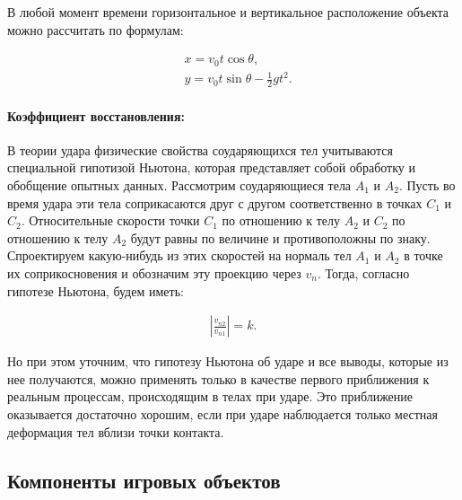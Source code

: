 В любой момент времени горизонтальное и вертикальное расположение объекта можно рассчитать по формулам:

\begin{align}
	& x = v_0 t \cos \theta, \label{math.position_x} \\
	& y = v_0 t \sin \theta - \frac12 g t^2. \label{math.position_y}
\end{align}

\paragraph{Коэффициент восстановления:}

В теории удара физические свойства соударяющихся тел учитываются специальной гипотизой Ньютона, которая представляет собой обработку и обобщение опытных данных. Рассмотрим соударяющиеся тела $A_1$ и $A_2$. Пусть во время удара эти тела соприкасаются друг с другом соответственно в точках $C_1$ и $C_2$. Относительные скорости точки $C_1$ по отношению к телу $A_2$ и $C_2$ по отношению к телу $A_2$ будут равны по величине и противоположны по знаку. Спроектируем какую-нибудь из этих скоростей на нормаль тел $A_1$ и $A_2$ в точке их соприкосновения и обозначим эту проекцию через $v_{n}$. Тогда, согласно гипотезе Ньютона, будем иметь:

\begin{align}
	\left|\frac{v_{n2}}{v_{n1}}\right| = k . \label{math.bounce}
\end{align}

Но при этом уточним, что гипотезу Ньютона об ударе и все выводы, которые из нее получаются, можно применять только в качестве первого приближения к реальным процессам, происходящим в телах при ударе. Это приближение оказывается достаточно хорошим, если при ударе наблюдается только местная деформация тел вблизи точки контакта.



\subsection{Компоненты игровых объектов}

